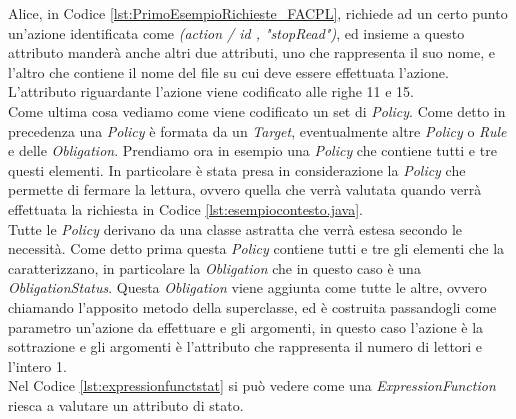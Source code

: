 Alice, in Codice \ref{lst:PrimoEsempioRichieste_FACPL}, richiede ad un certo punto un'azione identificata come \textit{(action / id , "stopRead")}, ed insieme a questo attributo manderà anche altri due attributi, uno che rappresenta il suo nome, e l'altro che contiene il nome del file su cui deve essere effettuata l'azione. L'attributo riguardante l'azione viene codificato alle righe 11 e 15.\\
Come ultima cosa vediamo come viene codificato un set di \textit{Policy}. Come detto in precedenza una \textit{Policy} è formata da un \textit{Target}, eventualmente altre \textit{Policy} o \textit{Rule} e delle \textit{Obligation}. Prendiamo ora in esempio una \textit{Policy} che contiene tutti e tre questi elementi.
In particolare è stata presa in considerazione la \textit{Policy} che permette di fermare la lettura, ovvero quella che verrà valutata quando verrà effettuata la richiesta in Codice \ref{lst:esempiocontesto.java}.\\
Tutte le \textit{Policy} derivano da una classe astratta che verrà estesa secondo le necessità. Come detto prima questa \textit{Policy} contiene tutti e tre gli elementi che la caratterizzano, in particolare la \textit{Obligation} che in questo caso è una \textit{ObligationStatus}. Questa \textit{Obligation} viene aggiunta come tutte le altre, ovvero chiamando l'apposito metodo della superclasse, ed è costruita passandogli come parametro un'azione da effettuare e gli argomenti, in questo caso l'azione è la sottrazione e gli argomenti è l'attributo che rappresenta il numero di lettori e l'intero 1. \\
Nel Codice \ref{lst:expressionfunctstat} si può vedere come una \textit{ExpressionFunction} riesca a valutare un attributo di stato.


    

